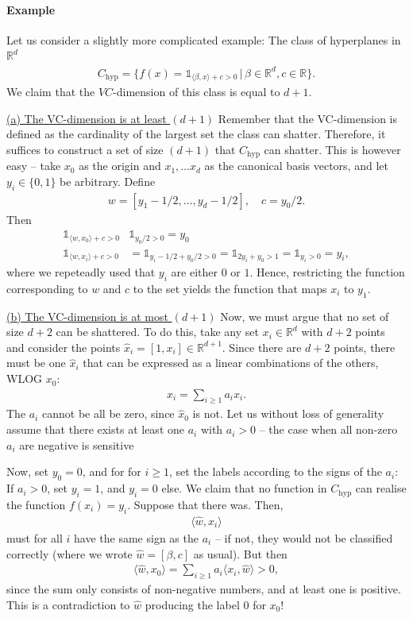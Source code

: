 \documentclass{article}
\newcommand{\sprod}[1]{\langle #1 \rangle}
\newcommand{\R}{\mathbb{R}}
\newcommand{\one}{\mathds{1}}
\begin{document}
\paragraph{Example} Let us consider a slightly more complicated example: The class of hyperplanes in $\R^{d}$ 
\begin{align*}
    C_{\mathrm{hyp}} = \{ f(x) = \one_{\sprod{\beta,x}+c>0} \, \vert \, \beta\in \R^d, c \in \R\}.
\end{align*}
We claim that the $VC$-dimension of this class is equal to $d+1$.

\underline{(a) The VC-dimension is at least $(d+1)$} Remember that the VC-dimension is defined as the cardinality of the largest set the class can shatter. Therefore, it suffices to construct a set of size $(d+1)$ that $C_{\mathrm{hyp}}$ can shatter. This is however easy -- take $x_0$ as the origin and $x_1, \dots x_d$ as the canonical basis vectors, and let $y_i \in \{0,1\}$ be arbitrary. Define
\begin{align*}
    w = [y_1-1/2, \dots, y_d-1/2], \quad  c = y_0/2.
\end{align*}
Then
\begin{align*}
    \one_{\sprod{w,x_0}+c>0} &  \one_{y_0/2>0} = y_0 \\
    \one_{\sprod{w,x_i}+c>0} &=  \one_{y_i -1/2 +  y_0/2>0} = \one_{2y_i + y_0>1} = \one_{y_i >0} = y_i,
\end{align*}
where we repeteadly used that $y_i$ are either $0$ or $1$. Hence, restricting the function corresponding to $w$ and $c$ to the set yields the function that maps $x_i$ to $y_1$.

\underline{(b) The VC-dimension is at most $(d+1)$} Now, we must argue that no set of size $d+2$ can be shattered. To do this, take any set $x_i \in \R^d$ with $d+2$ points and consider the points $\hat{x}_i = [1,x_i] \in \R^{d+1}$. Since there are $d+2$ points, there must be one $\hat{x}_i$ that can be expressed as a linear combinations of the others, WLOG $x_0$:
\begin{align*}
    x_i = \sum_{i\geq 1} a_i x_i.
\end{align*}
The $a_i$ cannot be all be zero, since $\hat{x}_0$ is not. Let us without loss of generality assume that there exists at least one $a_i$ with $a_i>0$ -- the case when all non-zero $a_i$ are negative is sensitive


Now, set $y_0= 0$, and for for $i \geq 1$, set the labels according to the signs of the $a_i$: If $a_i>0$, set $y_i=1$, and $y_i=0$ else. We claim that no function in $C_{\mathrm{hyp}}$ can realise the function $f(x_i)=y_i$. Suppose that there was. Then, 
\begin{align*}
  \sprod{\hat{w},x_i}
\end{align*}
must for all $i$ have the same sign as the $a_i$ -- if not, they would not be classified correctly (where we wrote $\hat{w}=[\beta,c]$ as usual). But then
\begin{align*}
   \sprod{\hat{w},x_0} = \sum_{i\geq 1} a_i \sprod{x_i,\hat{w}} >0,
\end{align*}
since the sum only consists of non-negative numbers, and at least one is positive. This is a contradiction to $\hat{w}$ producing the label $0$ for $x_0$!
\end{document}
